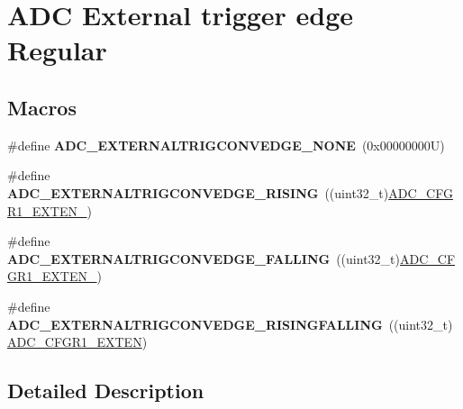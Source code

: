 \hypertarget{group___a_d_c___external__trigger__edge___regular}{}\section{A\+DC External trigger edge Regular}
\label{group___a_d_c___external__trigger__edge___regular}
\subsection*{Macros}
\begin{DoxyCompactItemize}
\item 
\mbox{\label{group___a_d_c___external__trigger__edge___regular_gab2e3a19c05441925f9b9a482238994ac}} 
\#define {\bfseries A\+D\+C\+\_\+\+E\+X\+T\+E\+R\+N\+A\+L\+T\+R\+I\+G\+C\+O\+N\+V\+E\+D\+G\+E\+\_\+\+N\+O\+NE}~(0x00000000\+U)
\item 
\mbox{\label{group___a_d_c___external__trigger__edge___regular_ga0aaa4e876de630733ca4ca4116b9608e}} 
\#define {\bfseries A\+D\+C\+\_\+\+E\+X\+T\+E\+R\+N\+A\+L\+T\+R\+I\+G\+C\+O\+N\+V\+E\+D\+G\+E\+\_\+\+R\+I\+S\+I\+NG}~((uint32\+\_\+t)\hyperlink{group___peripheral___registers___bits___definition_ga7bd587c78699a50b76f5e33f867285c2}{A\+D\+C\+\_\+\+C\+F\+G\+R1\+\_\+\+E\+X\+T\+E\+N\+\_})
\item 
\mbox{\label{group___a_d_c___external__trigger__edge___regular_ga15975c01b6a514f346272a1373239c54}} 
\#define {\bfseries A\+D\+C\+\_\+\+E\+X\+T\+E\+R\+N\+A\+L\+T\+R\+I\+G\+C\+O\+N\+V\+E\+D\+G\+E\+\_\+\+F\+A\+L\+L\+I\+NG}~((uint32\+\_\+t)\hyperlink{group___peripheral___registers___bits___definition_gaf280aa8043f44ba5af39f6d9381169a1}{A\+D\+C\+\_\+\+C\+F\+G\+R1\+\_\+\+E\+X\+T\+E\+N\+\_})
\item 
\mbox{\label{group___a_d_c___external__trigger__edge___regular_gab4221f5f52b5f75dc8cea701bb57be35}} 
\#define {\bfseries A\+D\+C\+\_\+\+E\+X\+T\+E\+R\+N\+A\+L\+T\+R\+I\+G\+C\+O\+N\+V\+E\+D\+G\+E\+\_\+\+R\+I\+S\+I\+N\+G\+F\+A\+L\+L\+I\+NG}~((uint32\+\_\+t)\hyperlink{group___peripheral___registers___bits___definition_gafc48e957d935d791a767c763b9225832}{A\+D\+C\+\_\+\+C\+F\+G\+R1\+\_\+\+E\+X\+T\+EN})
\end{DoxyCompactItemize}


\subsection{Detailed Description}
